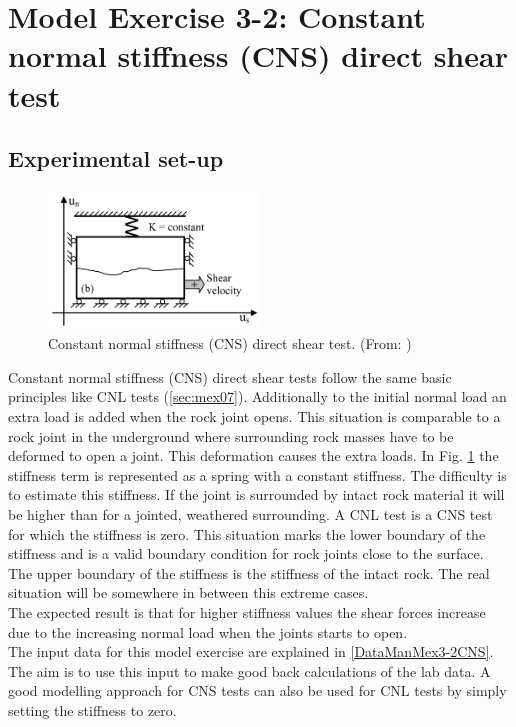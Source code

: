 \section{Model Exercise 3-2: Constant normal stiffness (CNS) direct shear test}
\label{sec:mex08}
\subsection{Experimental set-up}
\begin{figure}[!ht]
\begin{center}
\includegraphics[width=0.5\textwidth]{./figures/MEX8_CNS_Nguyen_Thesis.PNG}
\end{center}
\caption{Constant normal stiffness (CNS) direct shear test. (From: \cite{Nguyen2014})}
\label{fig:MEX8_CNS}
\end{figure}

Constant normal stiffness (CNS) direct shear tests follow the same basic principles like CNL tests (\ref{sec:mex07}). Additionally to the initial normal load an extra load is added when the rock joint opens. This situation is comparable to a rock joint in the underground where surrounding rock masses have to be deformed to open a joint. This deformation causes the extra loads. In Fig. \ref{fig:MEX8_CNS} the stiffness term is represented as a spring with a constant stiffness. The difficulty is to estimate this stiffness. If the joint is surrounded by intact rock material it will be higher than for a jointed, weathered surrounding. A CNL test is a CNS test for which the stiffness is zero. This situation marks the lower boundary of the stiffness and is a valid boundary condition for rock joints close to the surface. The upper boundary of the stiffness is the stiffness of the intact rock. The real situation will be somewhere in between this extreme cases.\\
The expected result is that for higher stiffness values the shear forces increase due to the increasing normal load when the joints starts to open.\\
The input data for this model exercise are explained in \ref{DataManMex3-2CNS}. The aim is to use this input to make good back calculations of the lab data. A good modelling approach for CNS tests can also be used for CNL tests by simply setting the stiffness to zero.


